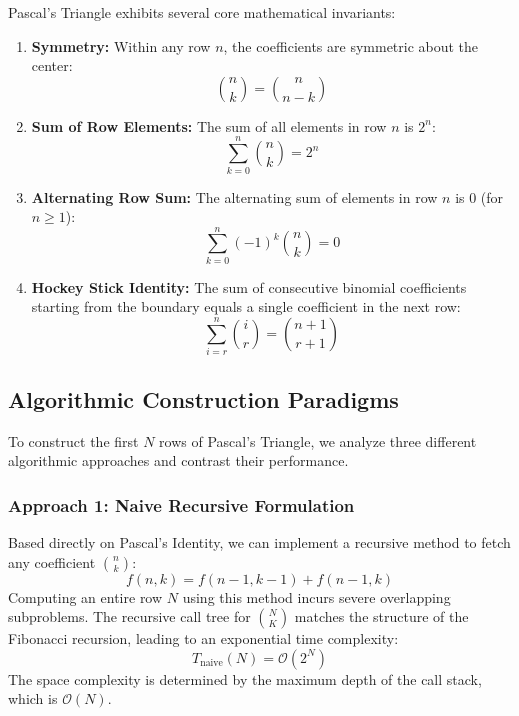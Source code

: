 \documentclass[10pt,journal,compsoc,onecolumn]{IEEEtran}
\begin{document}
Pascal's Triangle exhibits several core mathematical invariants:
\begin{enumerate}
    \item \textbf{Symmetry:} Within any row $n$, the coefficients are symmetric about the center:
    \begin{equation}
    \binom{n}{k} = \binom{n}{n - k}
    \end{equation}
    \item \textbf{Sum of Row Elements:} The sum of all elements in row $n$ is $2^n$:
    \begin{equation}
    \sum_{k=0}^{n} \binom{n}{k} = 2^n
    \end{equation}
    \item \textbf{Alternating Row Sum:} The alternating sum of elements in row $n$ is $0$ (for $n \ge 1$):
    \begin{equation}
    \sum_{k=0}^{n} (-1)^k \binom{n}{k} = 0
    \end{equation}
    \item \textbf{Hockey Stick Identity:} The sum of consecutive binomial coefficients starting from the boundary equals a single coefficient in the next row:
    \begin{equation}
    \sum_{i=r}^{n} \binom{i}{r} = \binom{n+1}{r+1}
    \end{equation}
\end{enumerate}

\subsection{Algorithmic Construction Paradigms}

To construct the first $N$ rows of Pascal's Triangle, we analyze three different algorithmic approaches and contrast their performance.

\subsubsection{Approach 1: Naive Recursive Formulation}

Based directly on Pascal's Identity, we can implement a recursive method to fetch any coefficient $\binom{n}{k}$:
\begin{equation}
f(n, k) = f(n-1, k-1) + f(n-1, k)
\end{equation}
Computing an entire row $N$ using this method incurs severe overlapping subproblems. The recursive call tree for $\binom{N}{K}$ matches the structure of the Fibonacci recursion, leading to an exponential time complexity:
\begin{equation}
T_{\text{naive}}(N) = \mathcal{O}(2^N)
\end{equation}
The space complexity is determined by the maximum depth of the call stack, which is $\mathcal{O}(N)$.
\end{document}
